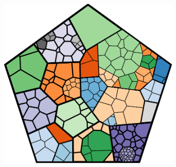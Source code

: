 \documentclass{acm_proc_article-sp} \usepackage{cite}
\begin{document}
\begin{figure}
\centering \includegraphics[width=90mm]{source-images/flare-color-pentagon-100.png}
\caption{}
\end{figure}
\end{document}
